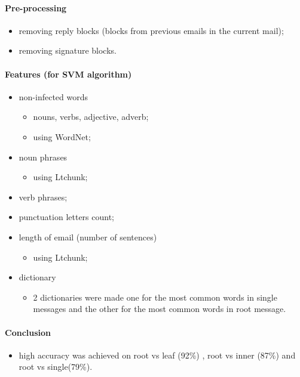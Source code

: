\documentclass[12pt]{article}
\begin{document}
\paragraph{Pre-processing}
\begin{itemize}
    \item removing reply blocks (blocks from previous emails in the current mail);
    \item removing signature blocks.
\end{itemize}

\paragraph{Features (for SVM algorithm)}
\begin{itemize}
    \item non-infected words
    \begin{itemize}
        \item nouns, verbs, adjective, adverb;
        \item using WordNet;
    \end{itemize}
    \item noun phrases
    \begin{itemize}
        \item using Ltchunk;
    \end{itemize}
    \item verb phrases;
    \item punctuation letters count;
    \item length of email (number of sentences)
    \begin{itemize}
        \item using Ltchunk;
    \end{itemize}
    \item dictionary
    \begin{itemize}
        \item 2 dictionaries were made one for the most common words in single 
	      messages and the other for the most common words in root message.
    \end{itemize}
\end{itemize}

\paragraph{Conclusion}
\begin{itemize}
    \item high accuracy was achieved on root vs leaf (92\%) , root vs inner (87\%) and root vs single(79\%).
\end{itemize}
\end{document}
